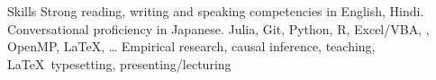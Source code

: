 
\begin{rubric}{Skills}
\entry*[Languages]
	Strong reading, writing and speaking competencies in English, Hindi.
	Conversational proficiency in Japanese.
	Julia, Git, Python, R, Excel/VBA, , OpenMP, \LaTeX, \ldots
\entry*[Misc.]
	Empirical research, causal inference, teaching, \LaTeX\ typesetting, presenting/lecturing
\end{rubric}
